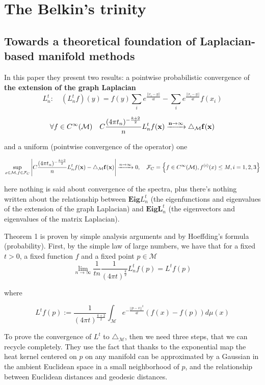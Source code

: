 \section{The Belkin's trinity}
\subsection{Towards a theoretical foundation of Laplacian-based manifold methods}

In this paper they present two results: a pointwise probabilistic convergence of \textbf{the extension of the graph Laplacian} 
$$L_n^t:\quad(L_n^tf)(y) = f(y)\sum_i e^\frac{||x_i-y||}{4t}-\sum_ie^\frac{||x_i-y||}{4t}f(x_i)$$

$$\forall f \in C^\infty(\mathcal M)\quad  C\frac{(4\pi t_n)^{-\frac{k+2}{2}}}{n} L_n^t f(\bf x) \xrightarrow{n\to\infty}\triangle_\mathcal M f(\bf x)$$

and a uniform (pointwise convergence of the operator) one

$$\sup_{x\in\mathcal M, f\in \mathcal F_C}\left| C\frac{(4\pi t_n)^{-\frac{k+2}{2}}}{n} L_n^t f(\bf x) - \triangle_\mathcal M f(\bf x) \right|\xrightarrow{n\to\infty}0
, \quad \mathcal F_C = \left\{f\in C^\infty(\mathcal M), f^{(i)}(x)\leq M, i=1,2,3\right\}$$

here nothing is said about convergence of the spectra, plus there's nothing written about the relationship between $\mathbf{Eig} L_n^t$ (the eigenfunctions and eigenvalues of the extension of the graph Laplacian) and $\mathbf {Eig} \mathbf {L}_n^t$ (the eigenvectors and eigenvalues of the matrix Laplacian).

Theorem 1 is proven by simple analysis arguments and by Hoeffding's formula (probability). 
First, by the simple law of large numbers, we have that for a fixed $t>0$, a fixed function $f$ and a fixed point $p\in\mathcal M$
\begin{equation}\label{eq:pointwise convergence of laplacian discrete approximation}
\lim_{n\to\infty}\frac{1}{tn}\frac{1}{ (4\pi t)^{\frac{k}{2}}}L_n^tf(p)= L^tf(p)
\end{equation}



where 

\begin{equation}\label{eq:L^t}
	L^tf(p) :=  \frac{1}{ (4\pi t)^{\frac{k+2}{2}}} \int_\mathcal Me^{-\frac{||p-x||^2}{4t}}\left(f(x)-f(p)\right)d\mu(x)
\end{equation}


To prove the convergence of $L^t$ to $\triangle_\mathcal M$, then we need three steps, that we can recycle completely. They use the fact that thanks to the exponential map the heat kernel centered on $p$ on any manifold can be approximated by a Gaussian in the ambient Euclidean space in a small neighborhood of $p$, and the relationship between Euclidean distances and geodesic distances.

